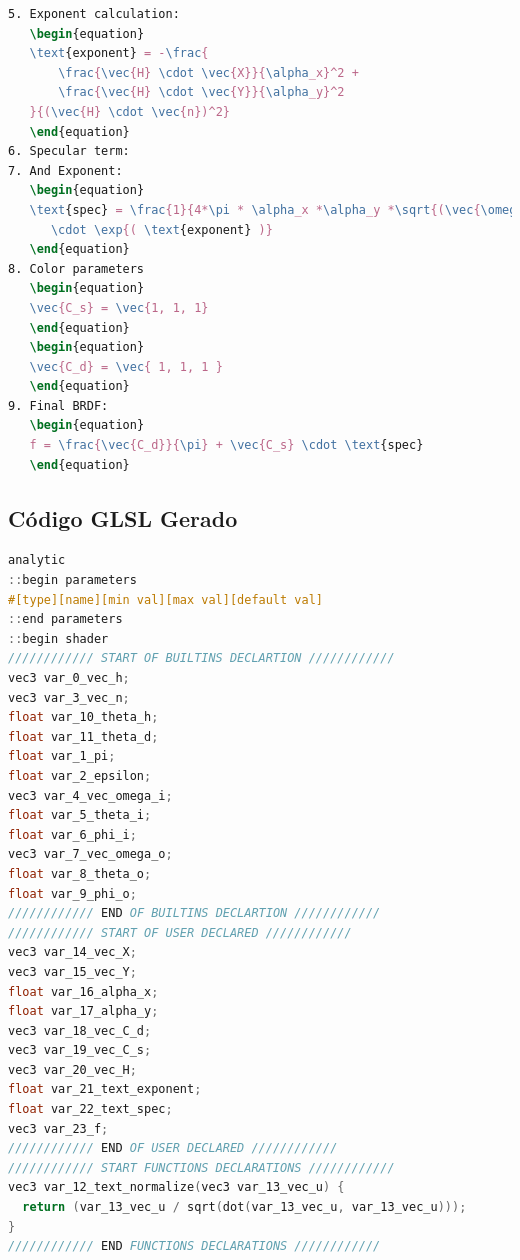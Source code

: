 \begin{codigo}[H]
    \caption{\small Código fonte da BRDF deste experimento (parte 2 de 2).}
    \label{cod-ward-eqlang-pt-2}
\begin{lstlisting}[language=tex, frame=none, inputencoding=utf8]
5. Exponent calculation:
   \begin{equation}
   \text{exponent} = -\frac{
       \frac{\vec{H} \cdot \vec{X}}{\alpha_x}^2 +
       \frac{\vec{H} \cdot \vec{Y}}{\alpha_y}^2
   }{(\vec{H} \cdot \vec{n})^2}
   \end{equation}
6. Specular term:
7. And Exponent:
   \begin{equation}
   \text{spec} = \frac{1}{4*\pi * \alpha_x *\alpha_y *\sqrt{(\vec{\omega_i} \cdot \vec{n}) * (\vec{\omega_o} \cdot \vec{n})}}
      \cdot \exp{( \text{exponent} )}
   \end{equation}
8. Color parameters
   \begin{equation}
   \vec{C_s} = \vec{1, 1, 1}
   \end{equation}
   \begin{equation}
   \vec{C_d} = \vec{ 1, 1, 1 }
   \end{equation}
9. Final BRDF:
   \begin{equation}
   f = \frac{\vec{C_d}}{\pi} + \vec{C_s} \cdot \text{spec}
   \end{equation}
\end{lstlisting}
\end{codigo}

\subsection{Código GLSL Gerado}
\begin{codigo}[H]
    \caption{\small Saída do compilador: código GLSL da BRDF deste experimento (parte 1 de 2).}
    \label{cod-ward-glsl-pt-1}
\begin{lstlisting}[language=C, inputencoding=utf8]
analytic
::begin parameters
#[type][name][min val][max val][default val]
::end parameters
::begin shader
//////////// START OF BUILTINS DECLARTION ////////////
vec3 var_0_vec_h;
vec3 var_3_vec_n;
float var_10_theta_h;
float var_11_theta_d;
float var_1_pi;
float var_2_epsilon;
vec3 var_4_vec_omega_i;
float var_5_theta_i;
float var_6_phi_i;
vec3 var_7_vec_omega_o;
float var_8_theta_o;
float var_9_phi_o;
//////////// END OF BUILTINS DECLARTION ////////////
//////////// START OF USER DECLARED ////////////
vec3 var_14_vec_X;
vec3 var_15_vec_Y;
float var_16_alpha_x;
float var_17_alpha_y;
vec3 var_18_vec_C_d;
vec3 var_19_vec_C_s;
vec3 var_20_vec_H;
float var_21_text_exponent;
float var_22_text_spec;
vec3 var_23_f;
//////////// END OF USER DECLARED ////////////
//////////// START FUNCTIONS DECLARATIONS ////////////
vec3 var_12_text_normalize(vec3 var_13_vec_u) {
  return (var_13_vec_u / sqrt(dot(var_13_vec_u, var_13_vec_u)));
}
//////////// END FUNCTIONS DECLARATIONS ////////////
\end{lstlisting}
\end{codigo}

